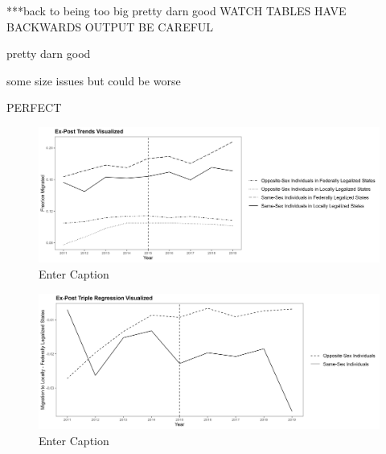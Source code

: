 \documentclass[]{article}
\begin{document}
***back to being too big
        \scalebox{1}{}
pretty darn good
WATCH TABLES HAVE BACKWARDS OUTPUT BE CAREFUL
\clearpage


pretty darn good

\clearpage

\begin{landscape}
\begin{center}

\end{center}
\end{landscape}
some size issues but could be worse

\clearpage

\begin{landscape}
\begin{center}

\end{center}
\end{landscape}
PERFECT

\clearpage

\begin{figure}
    \centering
    \includegraphics[width=1\linewidth]{outputs/summary_stats/post_trends.png}
    \caption{Enter Caption}
    \label{fig:enter-label}
\end{figure}

\begin{figure}
    \centering
    \includegraphics[width=1\linewidth]{outputs/summary_stats/post_diffs.png}
    \caption{Enter Caption}
    \label{fig:enter-label}
\end{figure}
\end{document}
